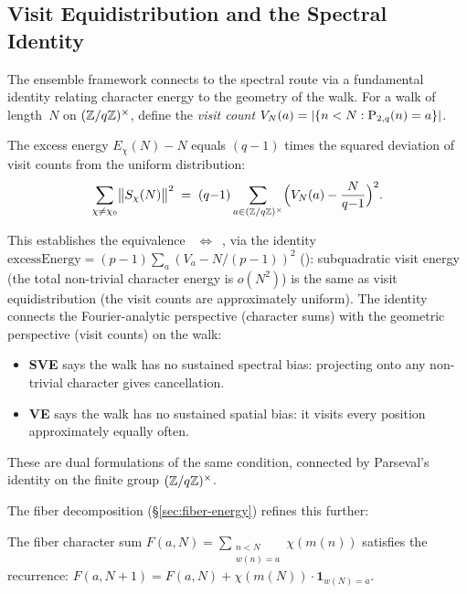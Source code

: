 \subsection{Visit Equidistribution and the Spectral Identity}
\label{sec:visit-eqd}

The ensemble framework connects to the spectral route via a
fundamental identity relating character energy to the geometry of the
walk.  For a walk of length~$N$ on $(\mathbb{Z}/q\mathbb{Z})^\times$, define the
\emph{visit count} $V_N(a) = |\{n < N : \mathrm{P}_{2,q}(n) = a\}|$.

\begin{theorem}
\label{thm:excess-energy}
The excess energy $E_\chi(N) - N$ equals $(q{-}1)$ times the
squared deviation of visit counts from the uniform distribution:
\[
  \sum_{\chi \neq \chi_0} \bigl\|S_\chi(N)\bigr\|^2
  \;=\; (q{-}1) \sum_{a \in (\mathbb{Z}/q\mathbb{Z})^\times}
  \Bigl(V_N(a) - \frac{N}{q{-}1}\Bigr)^2.
\]
\end{theorem}

This establishes the equivalence
~$\Leftrightarrow$~, via the identity
$\mathrm{excessEnergy} = (p{-}1)\sum_a (V_a - N/(p{-}1))^2$
(): subquadratic visit
energy (the total non-trivial character energy is $o(N^2)$) is the same
as visit equidistribution (the visit counts are approximately uniform).
The identity connects the Fourier-analytic perspective (character sums)
with the geometric perspective (visit counts) on the walk:
\begin{itemize}[nosep]
\item \textbf{SVE} says the walk has no sustained spectral bias:
  projecting onto any non-trivial character gives cancellation.
\item \textbf{VE} says the walk has no sustained spatial bias:
  it visits every position approximately equally often.
\end{itemize}
These are dual formulations of the same condition, connected by
Parseval's identity on the finite group $(\mathbb{Z}/q\mathbb{Z})^\times$.

The fiber decomposition (\S\ref{sec:fiber-energy}) refines this further:

\begin{theorem}
The fiber character sum $F(a, N) = \sum_{\substack{n < N \\ w(n) = a}}
\chi(m(n))$ satisfies the recurrence:
$F(a, N{+}1) = F(a, N) + \chi(m(N)) \cdot \mathbf{1}_{w(N) = a}$.
\end{theorem}

